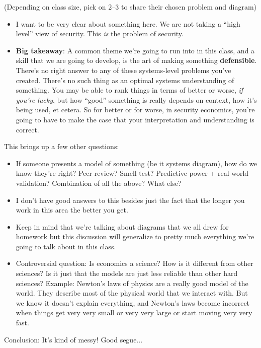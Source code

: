 \documentclass[11pt]{article}
\begin{document}
(Depending on class size, pick on 2--3 to share their chosen problem and diagram)

\begin{itemize}
    \item I want to be very clear about something here. We are not taking a ``high level'' view of security. This {\it is} the problem of security. 
    \item {\bf Big takeaway}: A common theme we're going to run into in this class, and a skill that we are going to develop, is the art of making something {\bf defensible}. There's no right answer to any of these systems-level problems you've created. There's no such thing as an optimal systems understanding of something. You may be able to rank things in terms of better or worse, {\it if you're lucky}, but how ``good'' something is really depends on context, how it's being used, et cetera. So for better or for worse, in security economics, you're going to have to make the case that your interpretation and understanding is correct. 
\end{itemize}

This brings up a few other questions:
\begin{itemize}
    \item If someone presents a model of something (be it systems diagram), how do we know they're right? Peer review? Smell test? Predictive power + real-world validation? Combination of all the above? What else?
    \item I don't have good answers to this besides just the fact that the longer you work in this area the better you get.  
    \item Keep in mind that we're talking about diagrams that we all drew for homework but this discussion will generalize to pretty much everything we're going to talk about in this class. 
    \item Controversial question: Is economics a science? How is it different from other sciences? Is it just that the models are just less reliable than other hard sciences? Example: Newton's laws of physics are a really good model of the world. They describe most of the physical world that we interact with. But we know it doesn't explain everything, and Newton's laws become incorrect when things get very very small or very very large or start moving very very fast. 
\end{itemize}


Conclusion: It's kind of messy! Good segue...

\end{document}
